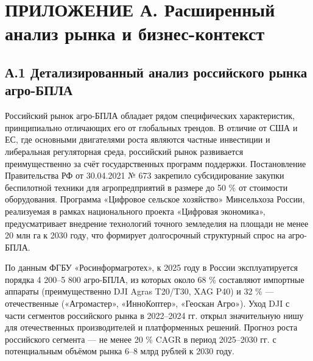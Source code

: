 \documentclass[14pt,a4paper]{extarticle}
\begin{document}
\hypertarget{ux43fux440ux438ux43bux43eux436ux435ux43dux438ux435-ux430.-ux440ux430ux441ux448ux438ux440ux435ux43dux43dux44bux439-ux430ux43dux430ux43bux438ux437-ux440ux44bux43dux43aux430-ux438-ux431ux438ux437ux43dux435ux441-ux43aux43eux43dux442ux435ux43aux441ux442}{%
\section{ПРИЛОЖЕНИЕ А. Расширенный анализ рынка и бизнес-контекст}\label{ux43fux440ux438ux43bux43eux436ux435ux43dux438ux435-ux430.-ux440ux430ux441ux448ux438ux440ux435ux43dux43dux44bux439-ux430ux43dux430ux43bux438ux437-ux440ux44bux43dux43aux430-ux438-ux431ux438ux437ux43dux435ux441-ux43aux43eux43dux442ux435ux43aux441ux442}}

\hypertarget{ux430.1-ux434ux435ux442ux430ux43bux438ux437ux438ux440ux43eux432ux430ux43dux43dux44bux439-ux430ux43dux430ux43bux438ux437-ux440ux43eux441ux441ux438ux439ux441ux43aux43eux433ux43e-ux440ux44bux43dux43aux430-ux430ux433ux440ux43e-ux431ux43fux43bux430}{%
\subsection{А.1 Детализированный анализ российского рынка агро-БПЛА}\label{ux430.1-ux434ux435ux442ux430ux43bux438ux437ux438ux440ux43eux432ux430ux43dux43dux44bux439-ux430ux43dux430ux43bux438ux437-ux440ux43eux441ux441ux438ux439ux441ux43aux43eux433ux43e-ux440ux44bux43dux43aux430-ux430ux433ux440ux43e-ux431ux43fux43bux430}}

Российский рынок агро-БПЛА обладает рядом специфических характеристик, принципиально отличающих его от глобальных трендов. В отличие от США и ЕС, где основными двигателями роста являются частные инвестиции и либеральная регуляторная среда, российский рынок развивается преимущественно за счёт государственных программ поддержки. Постановление Правительства РФ от 30.04.2021 № 673 закрепило субсидирование закупки беспилотной техники для агропредприятий в размере до 50 \% от стоимости оборудования. Программа «Цифровое сельское хозяйство» Минсельхоза России, реализуемая в рамках национального проекта «Цифровая экономика», предусматривает внедрение технологий точного земледелия на площади не менее 20 млн га к 2030 году, что формирует долгосрочный структурный спрос на агро-БПЛА.

По данным ФГБУ «Росинформагротех», к 2025 году в России эксплуатируется порядка 4 200--5 800 агро-БПЛА, из которых около 68 \% составляют импортные аппараты (преимущественно DJI Agras T20/T30, XAG P40) и 32 \% --- отечественные («Агромастер», «ИнноКоптер», «Геоскан Агро»). Уход DJI с части сегментов российского рынка в 2022--2024 гг. открыл значительную нишу для отечественных производителей и платформенных решений. Прогноз роста российского сегмента --- не менее 20 \% CAGR в период 2025--2030 гг. с потенциальным объёмом рынка 6--8 млрд рублей к 2030 году.
\end{document}

